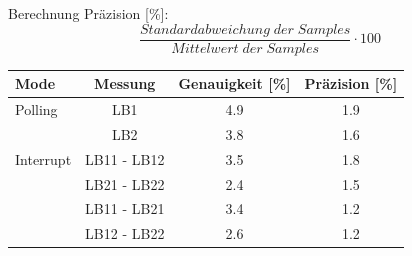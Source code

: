 Berechnung Präzision  [\%]:
\[ \frac{Standardabweichung\;der \; Samples}{Mittelwert\;der \; Samples}\cdot 100 \]

\begin{center}
    \begin{tabular}{lccc}
        \textbf{Mode} & \textbf{Messung} & \textbf{Genauigkeit [\%]} & \textbf{Präzision [\%]} \\ \hline
        Polling       &       LB1        & 4.9                     &  1.9                    \\
        &       LB2        & 3.8                     &  1.6                    \\
        Interrupt     &   LB11 - LB12    & 3.5                     &  1.8                    \\
        &   LB21 - LB22    & 2.4                     &  1.5                    \\
        &   LB11 - LB21    & 3.4                     &  1.2                    \\
        &   LB12 - LB22    & 2.6                     &  1.2 \\
    \end{tabular}
\end{center}

\clearpage

